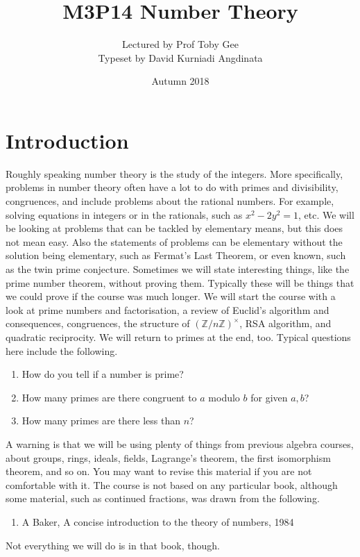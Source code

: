 \documentclass{article}
\title{M3P14 Number Theory}
\author{Lectured by Prof Toby Gee \\ Typeset by David Kurniadi Angdinata}
\date{Autumn 2018}
\newcommand{\Z}{\mathbb{Z}}
\newcommand{\rb}[1]{\left( #1 \right)}
\newcommand{\unit}[1]{\rb{\Z / #1\Z}^\times}
\theoremstyle{definition}\newtheorem{definition}{Definition}
\theoremstyle{definition}\newtheorem*{remark}{Remark}
\theoremstyle{definition}\newtheorem*{example}{Example}
\theoremstyle{definition}\newtheorem*{note}{Note}
\begin{document}
\maketitle

\vfill

\tableofcontents

\pagebreak


\section{Introduction}

Roughly speaking number theory is the study of the integers. More specifically, problems in number theory often have a lot to do with primes and divisibility, congruences, and include problems about the rational numbers. For example, solving equations in integers or in the rationals, such as $ x^2 - 2y^2 = 1 $, etc. We will be looking at problems that can be tackled by elementary means, but this does not mean easy. Also the statements of problems can be elementary without the solution being elementary, such as Fermat's Last Theorem, or even known, such as the twin prime conjecture. Sometimes we will state interesting things, like the prime number theorem, without proving them. Typically these will be things that we could prove if the course was much longer. We will start the course with a look at prime numbers and factorisation, a review of Euclid's algorithm and consequences, congruences, the structure of $ \unit{n} $, RSA algorithm, and quadratic reciprocity. We will return to primes at the end, too. Typical questions here include the following.
\begin{enumerate}
\item How do you tell if a number is prime?
\item How many primes are there congruent to $ a $ modulo $ b $ for given $ a, b $?
\item How many primes are there less than $ n $?
\end{enumerate}
A warning is that we will be using plenty of things from previous algebra courses, about groups, rings, ideals, fields, Lagrange's theorem, the first isomorphism theorem, and so on. You may want to revise this material if you are not comfortable with it. The course is not based on any particular book, although some material, such as continued fractions, was drawn from the following.
\begin{enumerate}
\item A Baker, A concise introduction to the theory of numbers, 1984
\end{enumerate}
Not everything we will do is in that book, though.
\end{document}

